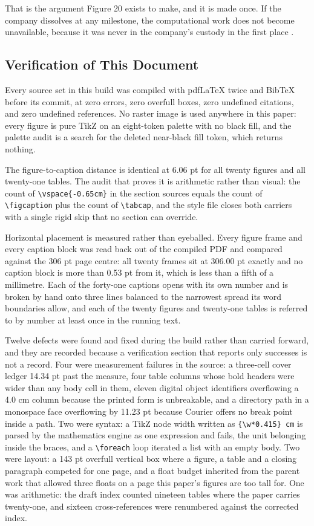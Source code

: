 That is the argument Figure 20 exists to make, and it is made once. If the
company dissolves at any milestone, the computational work does not become
unavailable, because it was never in the company's custody in the first place
\cite{repo2026}.

\subsection{Verification of This Document}

Every source set in this build was compiled with pdfLaTeX twice and BibTeX
before its commit, at zero errors, zero overfull boxes, zero undefined
citations, and zero undefined references. No raster image is used anywhere in
this paper: every figure is pure TikZ on an eight-token palette with no black
fill, and the palette audit is a search for the deleted near-black fill token,
which returns nothing.

The figure-to-caption distance is identical at 6.06 pt for all twenty figures
and all twenty-one tables. The audit that proves it is arithmetic rather than
visual: the count of \texttt{\textbackslash vspace\{-0.65cm\}} in the section
sources equals the count of \texttt{\textbackslash figcaption} plus the count of
\texttt{\textbackslash tabcap}, and the style file closes both carriers with a
single rigid skip that no section can override.

Horizontal placement is measured rather than eyeballed. Every figure frame and
every caption block was read back out of the compiled PDF and compared against
the 306 pt page centre: all twenty frames sit at 306.00 pt exactly and no
caption block is more than 0.53 pt from it, which is less than a fifth of a
millimetre. Each of the forty-one captions opens with its own number and
is broken by hand onto three lines balanced to the narrowest spread its word
boundaries allow, and each of the twenty figures and twenty-one tables is
referred to by number at least once in the running text.

Twelve defects were found and fixed during the build rather than carried forward,
and they are recorded because a verification section that reports only successes
is not a record. Four were measurement failures in the source: a three-cell
cover ledger 14.34 pt past the measure, four table columns whose bold headers
were wider than any body cell in them, eleven digital object identifiers
overflowing a 4.0 cm column because the printed form is unbreakable, and a
directory path in a monospace face overflowing by 11.23 pt because Courier
offers no break point inside a path. Two were syntax: a TikZ node width written
as \texttt{\{\textbackslash w*0.415\} cm} is parsed by the mathematics engine
as one expression and fails, the unit belonging inside the braces, and a
\texttt{\textbackslash foreach} loop iterated a list with an empty body. Two
were layout: a 143 pt overfull vertical box where a figure, a table and a
closing paragraph competed for one page, and a float budget inherited from the
parent work that allowed three floats on a page this paper's figures are too
tall for. One was arithmetic: the draft index counted nineteen tables where the
paper carries twenty-one, and sixteen cross-references were renumbered against
the corrected index.

